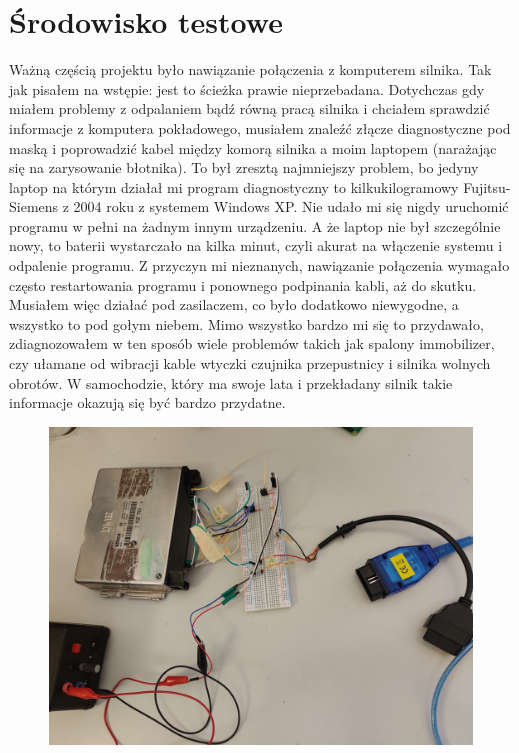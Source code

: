 \documentclass[declaration,shortabstract, inz]{iithesis}
\begin{document}
\section{Środowisko testowe} %
    Ważną częścią projektu było nawiązanie połączenia z komputerem silnika. Tak jak pisałem na wstępie: jest to ścieżka prawie nieprzebadana. Dotychczas gdy miałem problemy z odpalaniem bądź równą pracą silnika i chciałem sprawdzić informacje z komputera pokładowego, musiałem znaleźć złącze diagnostyczne pod maską i poprowadzić kabel między komorą silnika a moim laptopem (narażając się na zarysowanie błotnika). To był zresztą najmniejszy problem, bo jedyny laptop na którym działał mi program diagnostyczny to kilkukilogramowy Fujitsu-Siemens z 2004 roku z systemem Windows XP. Nie udało mi się nigdy uruchomić programu w pełni na żadnym innym urządzeniu. A że laptop nie był szczególnie nowy, to baterii wystarczało na kilka minut, czyli akurat na włączenie systemu i odpalenie programu. Z przyczyn mi nieznanych, nawiązanie połączenia wymagało często restartowania programu i ponownego podpinania kabli, aż do skutku. Musiałem więc działać pod zasilaczem, co było dodatkowo niewygodne, a wszystko to pod gołym niebem. Mimo wszystko bardzo mi się to przydawało, zdiagnozowałem w ten sposób wiele problemów takich jak spalony immobilizer, czy ułamane od wibracji kable wtyczki czujnika przepustnicy i silnika wolnych obrotów. W samochodzie, który ma swoje lata i przekładany silnik takie informacje okazują się być bardzo przydatne.
    
    \begin{figure}[htp]
        \centering
        \includegraphics[width=12cm]{images/test_setup_far.jpg}
        \label{fig:test_setup_far}
    \end{figure}
    \FloatBarrier
    
\end{document}
